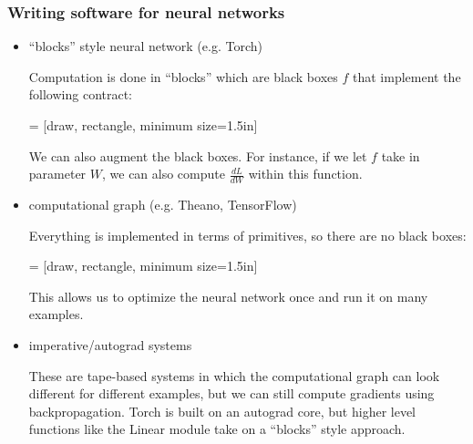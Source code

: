 \documentclass{article}
\begin{document}
\subsubsection{Writing software for neural networks}
\begin{itemize}
\item ``blocks'' style neural network (e.g. Torch)

Computation is done in ``blocks'' which are black boxes $f$  that implement the following contract:

 = [draw, rectangle, minimum size=1.5in]

We can also augment the black boxes. For instance, if we let $f$ take in parameter $W$, we can also compute $\frac{d L}{d W}$ within this function.

\item computational graph (e.g. Theano, TensorFlow)

Everything is implemented in terms of primitives, so there are no black boxes:

 = [draw, rectangle, minimum size=1.5in]

This allows us to optimize the neural network once and run it on many examples.

\item imperative/autograd systems

These are tape-based systems in which the computational graph can look different for different examples, but we can still compute gradients using backpropagation. Torch is built on an autograd core, but higher level functions like the Linear module take on a ``blocks'' style approach.

\end{itemize}
\end{document}
